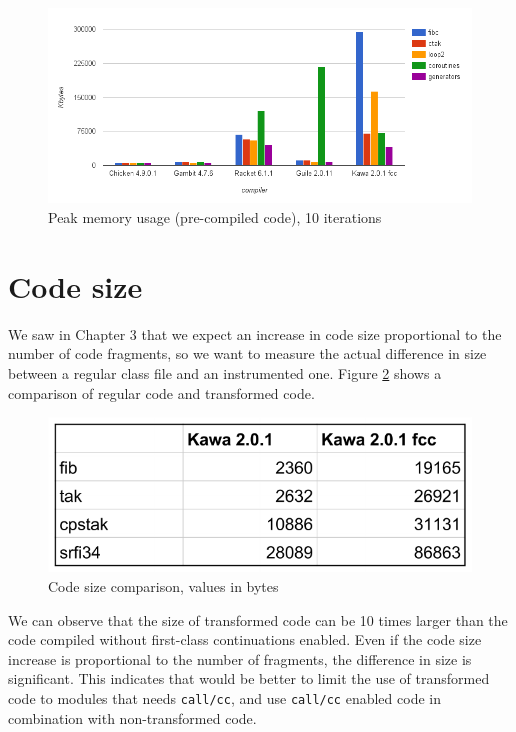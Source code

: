 \documentclass[12pt,a4paper,oneside,openright]{book}
\begin{document}
\begin{figure}[htbp]
\centering
\includegraphics{figures/mem-compiled.png}
\caption{Peak memory usage (pre-compiled code), 10 iterations
\label{compiled}}
\end{figure}

\section{Code size}\label{code-size-1}

We saw in Chapter 3 that we expect an increase in code size proportional
to the number of code fragments, so we want to measure the actual
difference in size between a regular class file and an instrumented one.
Figure \ref{codesize-tab} shows a comparison of regular code and
transformed code.

\begin{figure}[htbp]
\centering
\includegraphics{figures/codesize-table.pdf}
\caption{Code size comparison, values in bytes \label{codesize-tab}}
\end{figure}

We can observe that the size of transformed code can be 10 times larger
than the code compiled without first-class continuations enabled. Even
if the code size increase is proportional to the number of fragments,
the difference in size is significant. This indicates that would be
better to limit the use of transformed code to modules that needs
\texttt{call/cc}, and use \texttt{call/cc} enabled code in combination
with non-transformed code.
\end{document}
